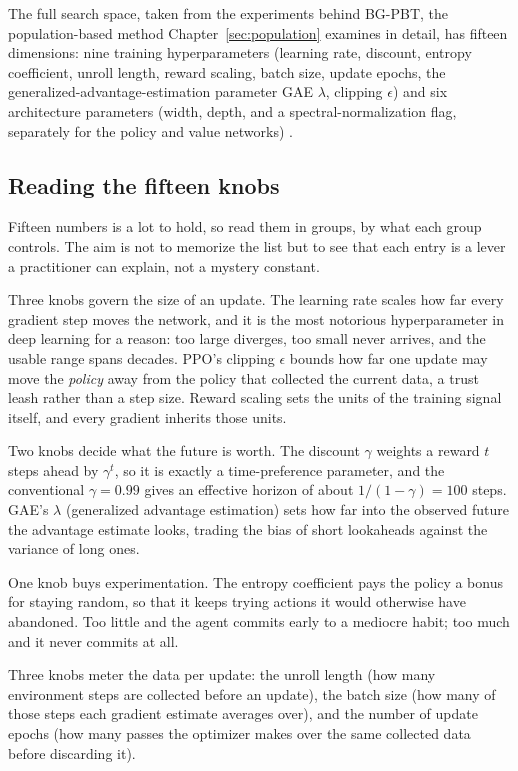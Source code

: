 The full search space, taken from the experiments behind BG-PBT, the
population-based method Chapter~\ref{sec:population} examines in
detail, has fifteen
dimensions: nine training hyperparameters (learning rate, discount, entropy
coefficient, unroll length, reward scaling, batch size, update epochs,
the generalized-advantage-estimation parameter GAE
$\lambda$, clipping $\epsilon$) and six architecture parameters (width,
depth, and a spectral-normalization flag, separately for the policy and
value networks) \citep{wan2022bgpbt}.

\subsection{Reading the fifteen knobs}

Fifteen numbers is a lot to hold, so read them in groups, by what each
group controls. The aim is not to memorize the list but to see that
each entry is a lever a practitioner can explain, not a mystery
constant.

Three knobs govern the size of an update. The learning rate scales how
far every gradient step moves the network, and it is the most
notorious hyperparameter in deep learning for a reason: too large
diverges, too small never arrives, and the usable range spans decades.
PPO's clipping $\epsilon$ bounds how far one update may move the
\emph{policy} away from the policy that collected the current data, a
trust leash rather than a step size. Reward scaling sets the units of
the training signal itself, and every gradient inherits those units.

Two knobs decide what the future is worth. The discount $\gamma$
weights a reward $t$ steps ahead by $\gamma^{t}$, so it is exactly a
time-preference parameter, and the conventional $\gamma = 0.99$ gives
an effective horizon of about $1/(1-\gamma) = 100$ steps. GAE's
$\lambda$ (generalized advantage estimation) sets how far into the
observed future the advantage estimate
looks, trading the bias of short lookaheads against the variance of
long ones.

One knob buys experimentation. The entropy coefficient pays the policy
a bonus for staying random, so that it keeps trying actions it would
otherwise have abandoned. Too little and the agent commits early to a
mediocre habit; too much and it never commits at all.

Three knobs meter the data per update: the unroll length (how many
environment steps are collected before an update), the batch size (how
many of those steps each gradient estimate averages over), and the
number of update epochs (how many passes the optimizer makes over the
same collected data before discarding it).


